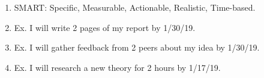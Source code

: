 \begin{enumerate}
    \item SMART: Specific, Measurable, Actionable, Realistic, Time-based.
    \item Ex. I will write 2 pages of my report by 1/30/19.
    \item Ex. I will gather feedback from 2 peers about my idea by 1/30/19. 
    \item Ex. I will research a new theory for 2 hours by 1/17/19. 
\end{enumerate}